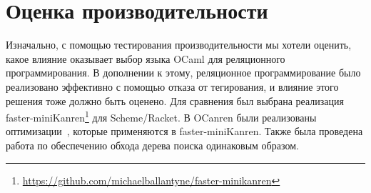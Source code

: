 

\section{Оценка производительности}
\label{sec:evaluation}

Изначально, с помощью тестирования производительности мы хотели оценить, какое влияние оказывает выбор языка OCaml для реляционного программирования.
В дополнении к этому, реляционное программирование было реализовано эффективно с помощью отказа от тегирования, и влияние этого решения тоже должно быть оценено.
Для сравнения был выбрана реализация faster-miniKanren\footnote{\url{https://github.com/michaelballantyne/faster-minikanren}} для Scheme/Racket.
В OCanren были реализованы
оптимизации~\cite{WillThesis},%
которые применяются в faster-miniKanren.
Также была проведена работа по обеспечению обхода дерева поиска одинаковым образом.
%

